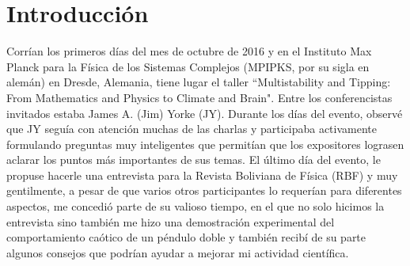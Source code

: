 \documentclass{rbf}
\begin{document}
\section{Introducción}\label{intro}
Corrían los primeros días del mes de octubre de 2016 y en el Instituto Max Planck para la Física de los Sistemas Complejos (MPIPKS, por su sigla en alemán) en Dresde, Alemania, tiene lugar el taller ``Multistability and Tipping: From Mathematics and Physics to Climate and Brain". Entre los conferencistas invitados estaba James A. (Jim) Yorke (JY). Durante los días del evento, observé que JY seguía con  atención muchas de las charlas y participaba activamente formulando preguntas muy inteligentes que permitían que los expositores lograsen aclarar los puntos más importantes de sus temas. El último día del evento, le propuse hacerle una entrevista para la Revista Boliviana de Física (RBF) y muy gentilmente, a pesar de que varios otros participantes lo requerían para diferentes aspectos, me concedió parte de su valioso tiempo, en el que no solo hicimos la entrevista sino también me hizo una demostración experimental del comportamiento caótico de un péndulo doble y también recibí de su parte algunos consejos que podrían ayudar a mejorar mi actividad científica.
\end{document}
